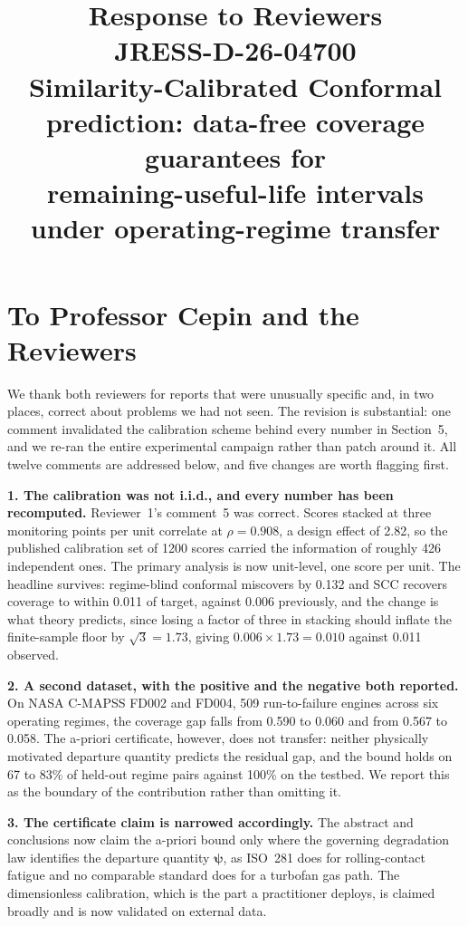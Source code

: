 \documentclass[11pt,a4paper]{article}
\title{\vspace{-12mm}\textbf{Response to Reviewers}\\[2mm]
\large JRESS-D-26-04700 \\
\large Similarity-Calibrated Conformal prediction: data-free coverage guarantees for\\
\large remaining-useful-life intervals under operating-regime transfer}
\date{}
\begin{document}
\maketitle
\vspace{-10mm}

\section*{To Professor Cepin and the Reviewers}

We thank both reviewers for reports that were unusually specific and, in two places, correct about
problems we had not seen. The revision is substantial: one comment invalidated the calibration
scheme behind every number in Section~5, and we re-ran the entire experimental campaign rather than
patch around it. All twelve comments are addressed below, and five changes are worth flagging
first.

\textbf{1. The calibration was not i.i.d., and every number has been recomputed.} Reviewer~1's
comment~5 was correct. Scores stacked at three monitoring points per unit
correlate at $\rho=0.908$, a design effect of 2.82, so the published calibration set of 1200 scores
carried the information of roughly 426 independent ones. The primary analysis is now unit-level,
one score per unit. The headline survives: regime-blind conformal miscovers by 0.132 and SCC
recovers coverage to within 0.011 of target, against 0.006 previously, and the change is what
theory predicts, since losing a factor of three in stacking should inflate the finite-sample floor
by $\sqrt3=1.73$, giving $0.006\times1.73=0.010$ against 0.011 observed.

\textbf{2. A second dataset, with the positive and the negative both reported.} On NASA C-MAPSS
FD002 and FD004, 509 run-to-failure engines across six operating regimes, the coverage gap falls
from 0.590 to 0.060 and from 0.567 to 0.058. The a-priori certificate, however, does not transfer:
neither physically motivated departure quantity predicts the residual gap, and the bound holds on
67 to 83\% of held-out regime pairs against 100\% on the testbed. We report this as the boundary of
the contribution rather than omitting it.

\textbf{3. The certificate claim is narrowed accordingly.} The abstract and conclusions now claim
the a-priori bound only where the governing degradation law identifies the departure quantity
$\boldsymbol\psi$, as ISO~281 does for rolling-contact fatigue and no comparable standard does for
a turbofan gas path. The dimensionless calibration, which is the part a practitioner deploys, is
claimed broadly and is now validated on external data.
\end{document}
